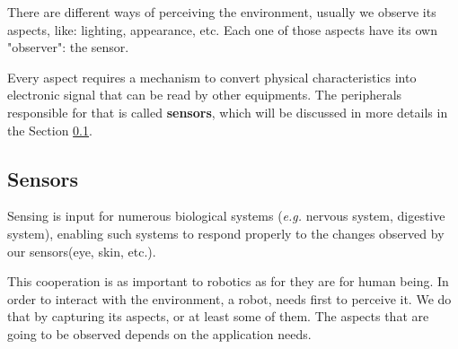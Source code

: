There are different ways of perceiving the environment, usually we observe its aspects, like: lighting, appearance, etc. Each one of those aspects have its own "observer": the sensor.

Every aspect requires a mechanism to convert physical characteristics into electronic signal that can be read by other equipments. The peripherals responsible for that is called \textbf{sensors}, which will be discussed in more details in the Section \ref{sec:sensors}.


\subsection{Sensors}
\label{sec:sensors}


Sensing is input for numerous biological systems (\textit{e.g.} nervous system, digestive system), enabling such systems to respond properly to the changes observed by our sensors(eye, skin, etc.). 

This cooperation is as important to robotics as for they are for human being. In order to interact with the environment, a robot, needs first to perceive it. We do that by capturing its aspects, or at least some of them. The aspects that are going to be observed depends on the application needs.

